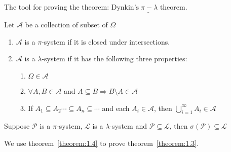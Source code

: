 \documentclass[11pt]{article}
\begin{document}
\vspace*{5mm}
The tool for proving the theorem: $\underline{\text{Dynkin's} \;\pi-\lambda \text{ theorem}}$.

\begin{definition}
    Let $\mathcal{A}$ be a collection of subset of $\Omega$
    \begin{enumerate}
        \item $\mathcal{A}$ is a $\pi$-system if it is closed under intersections.
        \item $\mathcal{A}$ is a $\lambda$-system if it has the following three properties:
        \begin{enumerate}
            \item $\Omega \in \mathcal{A}$
            \item $\forall A,B \in \mathcal{A}$ and $A \subseteq B \Longrightarrow B \setminus A \in \mathcal{A}$
            \item If $A_1 \subseteq A_2 \cdots \subseteq A_n \subseteq 
            \cdots$ and each $A_{i} \in \mathcal{A}$, then
            $\bigcup_{i=1}^{\infty} A_{i} \in \mathcal{A}$
        \end{enumerate}
    \end{enumerate}
\end{definition}

\begin{theorem}
    \label{theorem:1.4}
    Suppose $\mathcal{P}$ is a $\pi$-system, $\mathcal{L}$ is a $\lambda$-system and $\mathcal{P} \subseteq \mathcal{L}$,
    then $\sigma(\mathcal{P}) \subseteq \mathcal{L}$
\end{theorem}
We use theorem~\ref{theorem:1.4} to prove theorem~\ref{theorem:1.3}.
\end{document}
